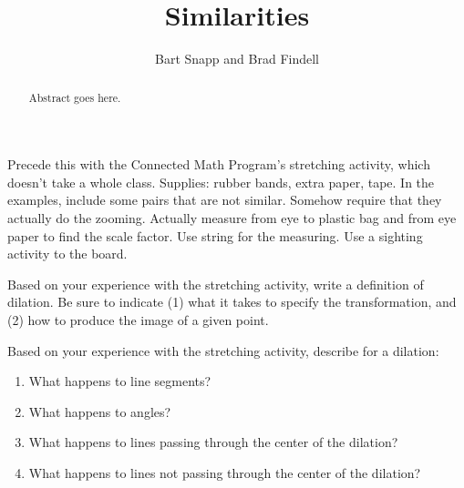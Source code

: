 \documentclass{ximera}
\title{Similarities}
\author{Bart Snapp and Brad Findell}
\begin{document}
\begin{abstract}
Abstract goes here.  
\end{abstract}
\maketitle

\begin{teachingnote}
Precede this with the Connected Math Program's stretching activity, which doesn't take a whole class.  
Supplies:  rubber bands, extra paper, tape.   
In the examples, include some pairs that are not similar.  Somehow require that they actually do the zooming.  Actually measure from eye to plastic bag and from eye paper to find the scale factor.  Use string for the measuring.  Use a sighting activity to the board.
\end{teachingnote}

\begin{problem}
Based on your experience with the stretching activity, write a definition of dilation.  Be sure to indicate (1) what it takes to specify the transformation, and (2) how to produce the image of a given point.  
\vspace{0.6in}
\end{problem}

\begin{problem}
Based on your experience with the stretching activity, describe for a dilation: 
\begin{enumerate}
\item What happens to line segments? 
\vspace{0.2in}
\item What happens to angles?  
\vspace{0.2in}
\item What happens to lines passing through the center of the dilation?
\vspace{0.2in}
\item What happens to lines not passing through the center of the dilation?
\vspace{0.2in}
\end{enumerate}
\end{problem}

\end{document}
